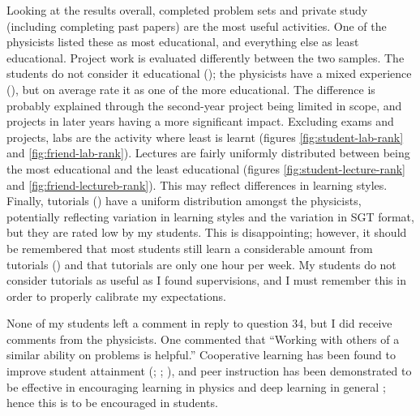 Looking at the results overall, completed problem sets and private study (including completing past papers) are the most useful activities. One of the physicists listed these as most educational, and everything else as least educational. Project work is evaluated differently between the two samples. The students do not consider it educational (); the physicists have a mixed experience (), but on average rate it as one of the more educational. The difference is probably explained through the second-year project being limited in scope, and projects in later years having a more significant impact. Excluding exams and projects, labs are the activity where least is learnt (figures \ref{fig:student-lab-rank} and \ref{fig:friend-lab-rank}). Lectures are fairly uniformly distributed between being the most educational and the least educational (figures \ref{fig:student-lecture-rank} and \ref{fig:friend-lectureb-rank}). This may reflect differences in learning styles. Finally, tutorials () have a uniform distribution amongst the physicists, potentially reflecting variation in learning styles and the variation in SGT format, but they are rated low by my students. This is disappointing; however, it should be remembered that most students still learn a considerable amount from tutorials () and that tutorials are only one hour per week. My students do not consider tutorials as useful as I found supervisions, and I must remember this in order to properly calibrate my expectations.

None of my students left a comment in reply to question 34, but I did receive comments from the physicists. One commented that ``Working with others of a similar ability on problems is helpful.'' Cooperative learning has been found to improve student attainment (\citealt{Qin1995}; \citealt[chapter 2]{Falchikov2001}; \citealt{Cabrera2002}), and peer instruction \citep{Roth1994} has been demonstrated to be effective in encouraging learning in physics \citep{Springer1999,Crouch2001,Pilzer2001,Miller2006} and deep learning in general \citep{Marton1976,Wilson2005}; hence this is to be encouraged in students.

